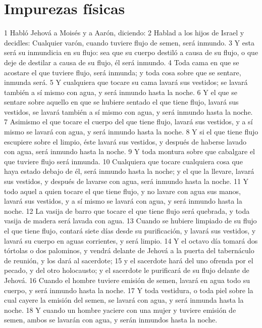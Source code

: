 \section*{Impurezas físicas}

1 Habló Jehová a Moisés y a Aarón, diciendo:
2 Hablad a los hijos de Israel y decidles: Cualquier varón, cuando tuviere flujo de semen, será inmundo.
3 Y esta será su inmundicia en su flujo: sea que su cuerpo destiló a causa de su flujo, o que deje de destilar a causa de su flujo, él será inmundo.
4 Toda cama en que se acostare el que tuviere flujo, será inmunda; y toda cosa sobre que se sentare, inmunda será.
5 Y cualquiera que tocare su cama lavará sus vestidos; se lavará también a sí mismo con agua, y será inmundo hasta la noche.
6 Y el que se sentare sobre aquello en que se hubiere sentado el que tiene flujo, lavará sus vestidos, se lavará también a sí mismo con agua, y será inmundo hasta la noche.
7 Asimismo el que tocare el cuerpo del que tiene flujo, lavará sus vestidos, y a sí mismo se lavará con agua, y será inmundo hasta la noche.
8 Y si el que tiene flujo escupiere sobre el limpio, éste lavará sus vestidos, y después de haberse lavado con agua, será inmundo hasta la noche.
9 Y toda montura sobre que cabalgare el que tuviere flujo será inmunda.
10 Cualquiera que tocare cualquiera cosa que haya estado debajo de él, será inmundo hasta la noche; y el que la llevare, lavará sus vestidos, y después de lavarse con agua, será inmundo hasta la noche.
11 Y todo aquel a quien tocare el que tiene flujo, y no lavare con agua sus manos, lavará sus vestidos, y a sí mismo se lavará con agua, y será inmundo hasta la noche.
12 La vasija de barro que tocare el que tiene flujo será quebrada, y toda vasija de madera será lavada con agua.
13 Cuando se hubiere limpiado de su flujo el que tiene flujo, contará siete días desde su purificación, y lavará sus vestidos, y lavará su cuerpo en aguas corrientes, y será limpio.
14 Y el octavo día tomará dos tórtolas o dos palominos, y vendrá delante de Jehová a la puerta del tabernáculo de reunión, y los dará al sacerdote;
15 y el sacerdote hará del uno ofrenda por el pecado, y del otro holocausto; y el sacerdote le purificará de su flujo delante de Jehová.
16 Cuando el hombre tuviere emisión de semen, lavará en agua todo su cuerpo, y será inmundo hasta la noche.
17 Y toda vestidura, o toda piel sobre la cual cayere la emisión del semen, se lavará con agua, y será inmunda hasta la noche.
18 Y cuando un hombre yaciere con una mujer y tuviere emisión de semen, ambos se lavarán con agua, y serán inmundos hasta la noche.
